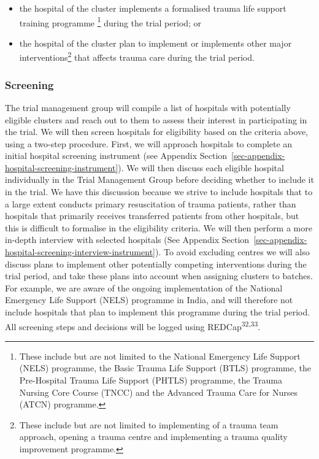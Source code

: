 \documentclass[
]{scrartcl}
\providecommand{\tightlist}{%
  \setlength{\itemsep}{0pt}\setlength{\parskip}{0pt}}\usepackage{longtable,booktabs,array}
\begin{document}
\begin{itemize}
\tightlist
\item
  the hospital of the cluster implements a formalised trauma life
  support training programme \footnote{These include but are not limited
    to the National Emergency Life Support (NELS) programme, the Basic
    Trauma Life Support (BTLS) programme, the Pre-Hospital Trauma Life
    Support (PHTLS) programme, the Trauma Nursing Core Course (TNCC) and
    the Advanced Trauma Care for Nurses (ATCN) programme.} during the
  trial period; or
\item
  the hospital of the cluster plan to implement or implements other
  major interventions\footnote{These include but are not limited to
    implementing of a trauma team approach, opening a trauma centre and
    implementing a trauma quality improvement programme.} that affects
  trauma care during the trial period.
\end{itemize}

\hypertarget{screening}{%
\subsubsection{Screening}\label{screening}}

The trial management group will compile a list of hospitals with
potentially eligible clusters and reach out to them to assess their
interest in participating in the trial. We will then screen hospitals
for eligibility based on the criteria above, using a two-step procedure.
First, we will approach hospitals to complete an initial hospital
screening instrument (see Appendix
Section~\ref{sec-appendix-hospital-screening-instrument}). We will then
discuss each eligible hospital individually in the Trial Management
Group before deciding whether to include it in the trial. We have this
discussion because we strive to include hospitals that to a large extent
conducts primary resuscitation of trauma patients, rather than hospitals
that primarily receives transferred patients from other hospitals, but
this is difficult to formalise in the eligibility criteria. We will then
perform a more in-depth interview with selected hospitals (See Appendix
Section~\ref{sec-appendix-hospital-screening-interview-instrument}). To
avoid excluding centres we will also discuss plans to implement other
potentially competing interventions during the trial period, and take
these plans into account when assigning clusters to batches. For
example, we are aware of the ongoing implementation of the National
Emergency Life Support (NELS) programme in India, and will therefore not
include hospitals that plan to implement this programme during the trial
period. All screening steps and decisions will be logged using
REDCap\textsuperscript{32,33}.
\end{document}
